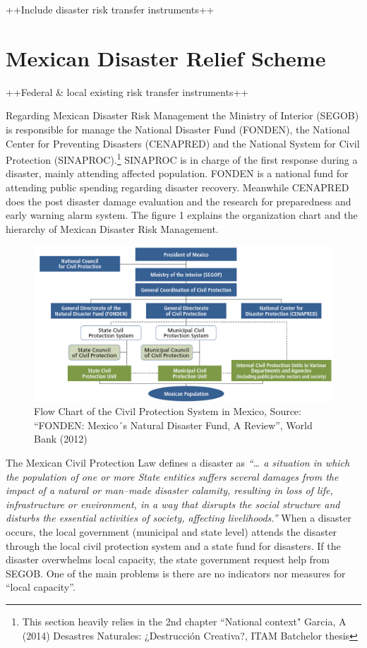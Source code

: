 \documentclass[]{article}
\let\rmarkdownfootnote\footnote%
\def\footnote{\protect\rmarkdownfootnote}
\begin{document}
++Include disaster risk transfer instruments++

\section{Mexican Disaster Relief
Scheme}\label{mexican-disaster-relief-scheme}

++Federal \& local existing risk transfer instruments++

Regarding Mexican Disaster Risk Management the Ministry of Interior
(SEGOB) is responsible for manage the National Disaster Fund (FONDEN),
the National Center for Preventing Disasters (CENAPRED) and the National
System for Civil Protection
(SINAPROC).\footnote{This section  heavily relies in the 2nd chapter ``National context" Garcia, A (2014) Desastres Naturales: ¿Destrucción Creativa?, ITAM Batchelor thesis}
SINAPROC is in charge of the first response during a disaster, mainly
attending affected population. FONDEN is a national fund for attending
public spending regarding disaster recovery. Meanwhile CENAPRED does the
post disaster damage evaluation and the research for preparedness and
early warning alarm system. The figure 1 explains the organization chart
and the hierarchy of Mexican Disaster Risk Management.

\begin{figure}[htbp]
\centering
\includegraphics{img/SEGOB.png}
\caption{Flow Chart of the Civil Protection System in Mexico,
\break Source: ``FONDEN: Mexico´s Natural Disaster Fund, A Review'',
World Bank (2012)}
\end{figure}

The Mexican Civil Protection Law defines a disaster as \emph{``\ldots{}
a situation in which the population of one or more State entities
suffers several damages from the impact of a natural or man--made
disaster calamity, resulting in loss of life, infrastructure or
environment, in a way that disrupts the social structure and disturbs
the essential activities of society, affecting livelihoods.''} When a
disaster occurs, the local government (municipal and state level)
attends the disaster through the local civil protection system and a
state fund for disasters. If the disaster overwhelms local capacity, the
state government request help from SEGOB. One of the main problems is
there are no indicators nor measures for ``local capacity''.
\end{document}
